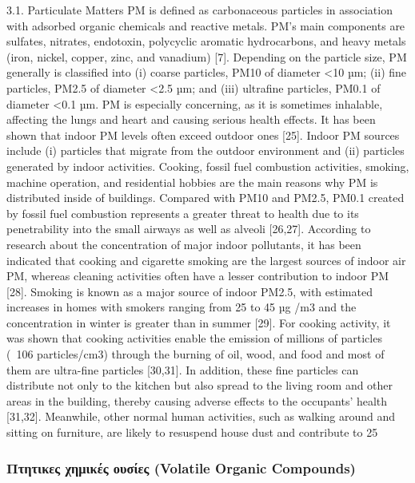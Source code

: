  3.1. Particulate Matters
PM is defined as carbonaceous particles in association with adsorbed organic chemicals and reactive metals. PM’s main components are sulfates, nitrates, endotoxin, polycyclic aromatic hydrocarbons, and heavy metals (iron, nickel, copper, zinc, and vanadium) [7]. Depending on the particle size, PM generally is classified into (i) coarse particles, PM10 of diameter <10 µm; (ii) fine particles, PM2.5 of diameter <2.5 µm; and (iii) ultrafine particles, PM0.1 of diameter <0.1 µm. PM is especially concerning, as it is sometimes inhalable, affecting the lungs and heart and causing serious health effects. It has been shown that indoor PM levels often exceed outdoor ones [25]. Indoor PM sources include (i) particles that migrate from the outdoor environment and (ii) particles generated by indoor activities. Cooking, fossil fuel combustion activities, smoking, machine operation, and residential hobbies are the main reasons why PM is distributed inside of buildings. Compared with PM10 and PM2.5, PM0.1 created by fossil fuel combustion represents a greater threat to health due to its penetrability into the small airways as well as alveoli [26,27]. According to research about the concentration of major indoor pollutants, it has been indicated that cooking and cigarette smoking are the largest sources of indoor air PM, whereas cleaning activities often have a lesser contribution to indoor PM [28]. Smoking is known as a major source of indoor PM2.5, with estimated increases in homes with smokers ranging from 25 to 45 µg /m3 and the concentration in winter is greater than in summer [29]. For cooking activity, it was shown that cooking activities enable the emission of millions of particles (~106 particles/cm3) through the burning of oil, wood, and food and most of them are ultra-fine particles [30,31]. In addition, these fine particles can distribute not only to the kitchen but also spread to the living room and other areas in the building, thereby causing adverse effects to the occupants’ health [31,32]. Meanwhile, other normal human activities, such as walking around and sitting on furniture, are likely to resuspend house dust and contribute to 25%

\cite{ijerph17082927}

\subsubsection{Πτητικες χημικές ουσίες (Volatile Organic Compounds)}


